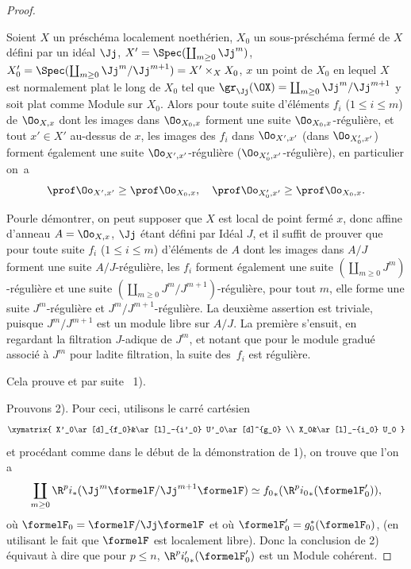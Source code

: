 \begin{proof}
\begin{lemme} \label{XII.4.2}
Soient $X$ un pr\'esch\'ema localement noeth\'erien, $X_0$ un sous-pr\'esch\'ema ferm\'e de $X$ d\'efini par un id\'eal $\Jj$, $X'=\Spec(\coprod_{m\geq 0} \Jj^m)$, $X_0'=\Spec(\coprod_{m\geq 0} \Jj^m/\Jj^{m+1}) = X'\times_XX_0$, $x$ un point de $X_0$ en lequel $X$ est normalement plat le long de $X_0$ \ie tel que $\gr_{\Jj}(\OX)= \coprod_{m\geq 0}\Jj^m/\Jj^{m+1}$ y soit plat comme Module sur $X_0$. Alors pour toute suite d'\'el\'ements $f_i$ ($1\leq i\leq m$) de $\Oo_{X, x}$ dont les images dans $\Oo_{X_0, x}$ forment une suite $\Oo_{X_0, x}$-r\'eguli\`ere, et tout $x'\in X'$ au-dessus de $x$, les images des $f_i$ dans $\Oo_{X', x'}$ (\resp dans $\Oo_{X'_0, x'}$) forment \'egalement une suite $\Oo_{X', x'}$-r\'eguli\`ere (\resp $\Oo_{X'_0, x'}$-r\'eguli\`ere), en particulier on~a
\steco
\begin{equation} \label{eq:XII.23}
\prof \Oo_{X', x'} \geq \prof \Oo_{X_0, x}, \quad \prof \Oo_{X'_0, x'} \geq \prof \Oo_{X_0, x}.
\end{equation}
\end{lemme}

Pour\pageoriginale le d\'emontrer, on peut supposer que $X$ est local de point ferm\'e $x$, donc affine d'anneau $A=\Oo_{X, x}$, $\Jj$ \'etant d\'efini par Id\'eal $J$, et il suffit de prouver que pour toute suite $f_i$ ($1\leq i\leq m$) d'\'el\'ements de $A$ dont les images dans $A/J$ forment une suite $A/J$-r\'eguli\`ere, les $f_i$ forment \'egalement une suite $(\coprod_{m\geq 0} J^m)$-r\'eguli\`ere et une suite $(\coprod_{m\geq 0} J^m/J^{m+1})$-r\'eguli\`ere, \ie pour tout $m$, elle forme une suite $J^m$-r\'eguli\`ere et $J^m/J^{m+1}$-r\'eguli\`ere. La deuxi\`eme assertion est triviale, puisque $J^m/J^{m+1}$ est un module libre sur $A/J$. La premi\`ere s'ensuit, en regardant la filtration $J$-adique de $J^m$, et notant que pour le module gradu\'e associ\'e \`a $J^m$ pour ladite filtration, la suite des~$f_i$ est r\'eguli\`ere.

Cela prouve  et par suite ~1\noo).

Prouvons  2\noo). Pour ceci, utilisons le carr\'e cart\'esien
\[
\xymatrix{
X'_0\ar[d]_{f_0}&\ar[l]_-{i'_0} U'_0\ar[d]^{g_0} \\
X_0&\ar[l]_-{i_0} U_0
}
\]
et proc\'edant comme dans le d\'ebut de la d\'emonstration de 1\noo), on trouve que l'on a
\steco
\begin{equation} \label{eq:XII.24}
\coprod_{m\geq 0} \R^pi_\ast(\Jj^m\formelF/\Jj^{m+1}\formelF) \simeq {f_0}_\ast (\R^p{i_0}_\ast(\formelF_0')),
\end{equation}
o\`u $\formelF_0=\formelF/\Jj\formelF$ et o\`u $\formelF_0'=g_0^\ast(\formelF_0)$, (en utilisant le fait que $\formelF$ est localement libre). Donc la conclusion de 2\noo) \'equivaut \`a dire que pour $p\leq n$, $\R^p{i'_0}_\ast(\formelF_0')$ est un Module coh\'erent.


\end{proof}
